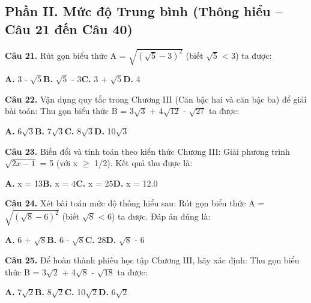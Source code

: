 \documentclass[11pt,a4paper]{article}
\begin{document}
\subsection*{\color{accent} Phần II. Mức độ Trung bình (Thông hiểu -- Câu 21 đến Câu 40)}
\textbf{\color{primary} Câu 21.} Rút gọn biểu thức A = $\sqrt{(\sqrt{5} - 3)^2}$ (biết $\sqrt{5}$ < 3) ta được:\par
\hspace*{1.5em}\textbf{A.} 3 - $\sqrt{5}$\quad\quad \textbf{B.} $\sqrt{5}$ - 3\quad\quad \textbf{C.} 3 + $\sqrt{5}$\quad\quad \textbf{D.} 4\par\vspace{2pt}
\textbf{\color{primary} Câu 22.} Vận dụng quy tắc trong Chương III (Căn bậc hai và căn bậc ba) để giải bài toán: Thu gọn biểu thức B = 3$\sqrt{3}$ + 4$\sqrt{12}$ - $\sqrt{27}$ ta được:\par
\hspace*{1.5em}\textbf{A.} 6$\sqrt{3}$\quad\quad \textbf{B.} 7$\sqrt{3}$\quad\quad \textbf{C.} 8$\sqrt{3}$\quad\quad \textbf{D.} 10$\sqrt{3}$\par\vspace{2pt}
\textbf{\color{primary} Câu 23.} Biến đổi và tính toán theo kiến thức Chương III: Giải phương trình $\sqrt{2x - 1}$ = 5 (với x $\ge$ 1/2). Kết quả thu được là:\par
\hspace*{1.5em}\textbf{A.} x = 13\quad\quad \textbf{B.} x = 4\quad\quad \textbf{C.} x = 25\quad\quad \textbf{D.} x = 12.0\par\vspace{2pt}
\textbf{\color{primary} Câu 24.} Xét bài toán mức độ thông hiểu sau: Rút gọn biểu thức A = $\sqrt{(\sqrt{8} - 6)^2}$ (biết $\sqrt{8}$ < 6) ta được. Đáp án đúng là:\par
\hspace*{1.5em}\textbf{A.} 6 + $\sqrt{8}$\quad\quad \textbf{B.} 6 - $\sqrt{8}$\quad\quad \textbf{C.} 28\quad\quad \textbf{D.} $\sqrt{8}$ - 6\par\vspace{2pt}
\textbf{\color{primary} Câu 25.} Để hoàn thành phiếu học tập Chương III, hãy xác định: Thu gọn biểu thức B = 3$\sqrt{2}$ + 4$\sqrt{8}$ - $\sqrt{18}$ ta được:\par
\hspace*{1.5em}\textbf{A.} 7$\sqrt{2}$\quad\quad \textbf{B.} 8$\sqrt{2}$\quad\quad \textbf{C.} 10$\sqrt{2}$\quad\quad \textbf{D.} 6$\sqrt{2}$\par\vspace{2pt}
\end{document}
